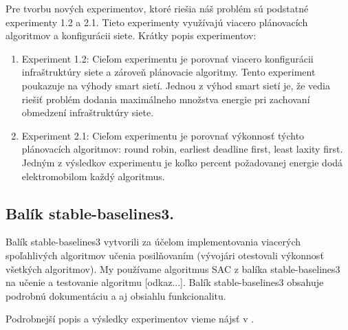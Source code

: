 Pre tvorbu nových experimentov, ktoré riešia náš problém sú podstatné experimenty 1.2 a 2.1. Tieto experimenty využívajú viacero plánovacích algoritmov a konfigurácii siete. Krátky popis experimentov:
\begin{enumerate}
    \item Experiment 1.2: Cieľom experimentu je porovnať viacero konfigurácii infraštruktúry siete a zároveň plánovacie algoritmy. Tento experiment poukazuje na výhody smart sietí. Jednou z výhod smart sietí je, že vedia riešiť problém dodania maximálneho množstva energie pri zachovaní obmedzení infraštruktúry siete.
    \item Experiment 2.1: Cieľom experimentu je porovnať výkonnosť týchto plánovacích algoritmov:  round robin,  earliest deadline first, least laxity first. Jedným z výsledkov experimentu je koľko percent požadovanej energie dodá elektromobilom každý algoritmus.
\end{enumerate}


\subsection{Balík stable-baselines3.}
\label{technologie:sb3}

Balík stable-baselines3 vytvorili za účelom implementovania viacerých spoľahlivých algoritmov učenia posilňovaním (vývojári otestovali výkonnosť všetkých algoritmov). My používame algoritmus SAC z balíka stable-baselines3 na učenie a testovanie algoritmu [odkaz...].  Balík stable-baselines3 obsahuje podrobnú dokumentáciu a aj obsiahlu funkcionalitu.




Podrobnejší popis a výsledky experimentov vieme nájsť v \cite{acnportalexperimentsrepository}.




